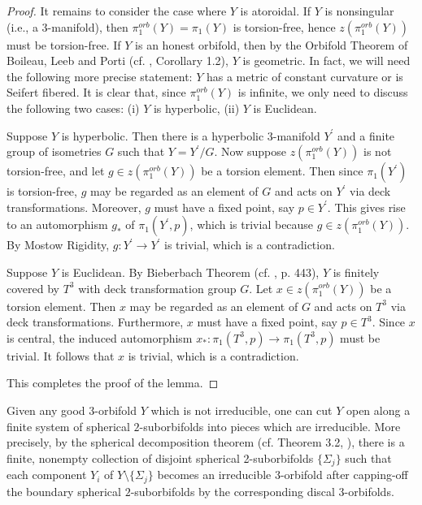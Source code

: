 \documentclass[11pt]{amsart}
\theoremstyle{plain}
\numberwithin{theorem}{section}
\theoremstyle{definition}
\begin{document}
\begin{proof}
It remains to consider the case where $Y$ is atoroidal. If $Y$ is nonsingular (i.e., a $3$-manifold), 
then $\pi_1^{orb}(Y)=\pi_1(Y)$ is torsion-free, hence $z(\pi_1^{orb}(Y))$ must be torsion-free.
If $Y$ is an honest orbifold, then by the Orbifold Theorem of Boileau, Leeb and Porti
(cf. \cite{BLP}, Corollary 1.2), $Y$ is 
geometric. In fact, we will need the following more precise statement: $Y$ has a metric of constant 
curvature or is Seifert fibered. It is clear that, since $\pi^{orb}_1(Y)$ is infinite, we only need to
discuss the following two cases: (i) $Y$ is hyperbolic, (ii) $Y$ is Euclidean.

Suppose $Y$ is hyperbolic. Then there is a hyperbolic $3$-manifold $Y^\prime$ and a finite
group of isometries $G$ such that $Y=Y^\prime/G$. Now suppose $z(\pi_1^{orb}(Y))$ is not 
torsion-free, and let $g\in z(\pi_1^{orb}(Y))$ be a torsion element. Then since $\pi_1(Y^\prime)$ is torsion-free, $g$ may be regarded as an element of $G$ and acts on $Y^\prime$ via deck transformations. Moreover, $g$ must have a fixed point, say $p\in Y^\prime$. This gives rise
to an automorphism $g_\ast$ of $\pi_1(Y^\prime,p)$, which is trivial because $g\in z(\pi_1^{orb}(Y))$.
By Mostow Rigidity, $g:Y^\prime\rightarrow Y^\prime$ is trivial, which is a contradiction. 

Suppose $Y$ is Euclidean. By Bieberbach Theorem (cf. \cite{Sct}, p. 443), $Y$ is finitely covered
by $T^3$ with deck transformation group $G$. Let $x\in z(\pi_1^{orb}(Y))$ be a torsion element. 
Then $x$ may be regarded as an element of $G$ and acts on $T^3$ via deck transformations.
Furthermore, $x$ must have a fixed point, say $p\in T^3$. Since $x$ is central, the induced
automorphism $x_\ast: \pi_1(T^3,p)\rightarrow\pi_1(T^3,p)$ must be trivial. It follows that $x$
is trivial, which is a contradiction. 

This completes the proof of the lemma.

\end{proof}

Given any good $3$-orbifold $Y$ which is not irreducible, one can cut $Y$ open 
along a finite system of spherical $2$-suborbifolds into pieces which are irreducible. 
More precisely, by the spherical decomposition theorem (cf. Theorem 3.2, \cite{BMP}), there 
is a finite, nonempty collection of disjoint spherical 2-suborbifolds $\{\Sigma_j\}$ such that 
each component $Y_i$ of $Y\setminus \{\Sigma_j\}$ becomes an irreducible $3$-orbifold 
after capping-off the boundary spherical $2$-suborbifolds by the corresponding discal 
$3$-orbifolds. 
\end{document}
